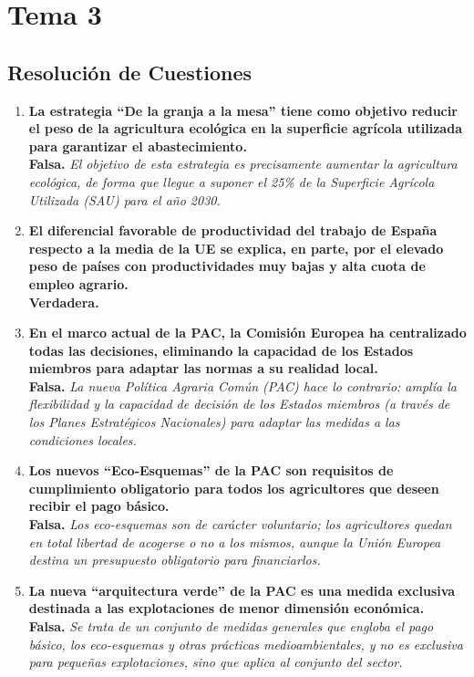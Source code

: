 \section{Tema 3}
\subsection*{Resolución de Cuestiones}

\begin{enumerate}[label=\textbf{\arabic*.}]

    \item \textbf{La estrategia ``De la granja a la mesa'' tiene como objetivo reducir el peso de la agricultura ecológica en la superficie agrícola utilizada para garantizar el abastecimiento.} \\
    \textbf{Falsa.} \textit{El objetivo de esta estrategia es precisamente aumentar la agricultura ecológica, de forma que llegue a suponer el 25\% de la Superficie Agrícola Utilizada (SAU) para el año 2030.}

    \item \textbf{El diferencial favorable de productividad del trabajo de España respecto a la media de la UE se explica, en parte, por el elevado peso de países con productividades muy bajas y alta cuota de empleo agrario.} \\
    \textbf{Verdadera.}

    \item \textbf{En el marco actual de la PAC, la Comisión Europea ha centralizado todas las decisiones, eliminando la capacidad de los Estados miembros para adaptar las normas a su realidad local.} \\
    \textbf{Falsa.} \textit{La nueva Política Agraria Común (PAC) hace lo contrario: amplía la flexibilidad y la capacidad de decisión de los Estados miembros (a través de los Planes Estratégicos Nacionales) para adaptar las medidas a las condiciones locales.}

    \item \textbf{Los nuevos ``Eco-Esquemas'' de la PAC son requisitos de cumplimiento obligatorio para todos los agricultores que deseen recibir el pago básico.} \\
    \textbf{Falsa.} \textit{Los eco-esquemas son de carácter voluntario; los agricultores quedan en total libertad de acogerse o no a los mismos, aunque la Unión Europea destina un presupuesto obligatorio para financiarlos.}

    \item \textbf{La nueva ``arquitectura verde'' de la PAC es una medida exclusiva destinada a las explotaciones de menor dimensión económica.} \\
    \textbf{Falsa.} \textit{Se trata de un conjunto de medidas generales que engloba el pago básico, los eco-esquemas y otras prácticas medioambientales, y no es exclusiva para pequeñas explotaciones, sino que aplica al conjunto del sector.}


\end{enumerate}
